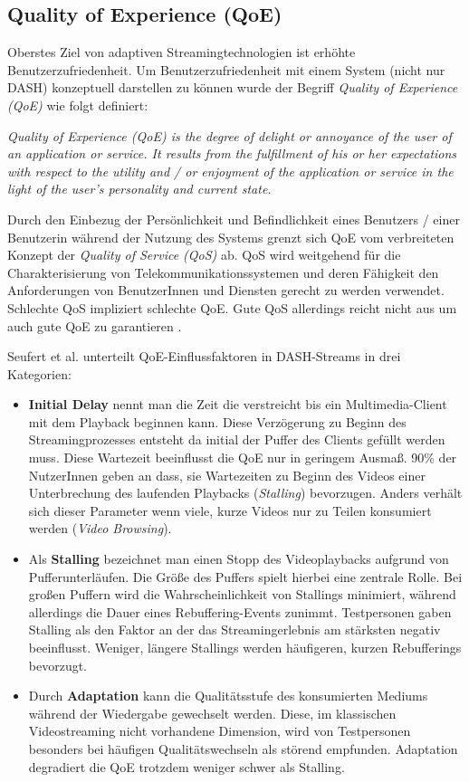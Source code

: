 \documentclass[paper = a4, fontsize = 12pt, parskip = half]{scrartcl} %
\begin{document}
\subsection{Quality of Experience (QoE)}
Oberstes Ziel von adaptiven Streamingtechnologien ist erhöhte Benutzerzufriedenheit. Um Benutzerzufriedenheit mit einem System (nicht nur DASH) konzeptuell darstellen zu können wurde der Begriff \textit{Quality of Experience (QoE)} wie folgt definiert:

\glqq \textit{Quality of Experience (QoE) is the degree of delight or annoyance of the user of an application or service. It results from the fulfillment of his or her expectations with respect to the utility and / or enjoyment of the application or service in the light of the user’s personality and current state.}\grqq \cite{brunnstrom_qualinet_2013}

Durch den Einbezug der Persönlichkeit und Befindlichkeit eines Benutzers / einer Benutzerin während der Nutzung des Systems grenzt sich QoE vom verbreiteten Konzept der \textit{Quality of Service (QoS)} ab. QoS wird weitgehend für die Charakterisierung von Telekommunikationssystemen und deren Fähigkeit den Anforderungen von BenutzerInnen und Diensten gerecht zu werden verwendet. Schlechte QoS impliziert schlechte QoE. Gute QoS allerdings reicht nicht aus um auch gute QoE zu garantieren \cite{brunnstrom_qualinet_2013}.

Seufert et al. \cite{seufert_survey_2015} unterteilt QoE-Einflussfaktoren in DASH-Streams in drei Kategorien:
\begin{itemize}
	\item \textbf{Initial Delay} nennt man die Zeit die verstreicht bis ein Multimedia-Client mit dem Playback beginnen kann. Diese Verzögerung zu Beginn des Streamingprozesses entsteht da initial der Puffer des Clients gefüllt werden muss. Diese Wartezeit beeinflusst die QoE nur in geringem Ausmaß. 90\% der NutzerInnen geben an dass, sie Wartezeiten zu Beginn des Videos einer Unterbrechung des laufenden Playbacks (\textit{Stalling}) bevorzugen. Anders verhält sich dieser Parameter wenn viele, kurze Videos nur zu Teilen konsumiert werden (\textit{Video Browsing}).
	\item Als \textbf{Stalling} bezeichnet man einen Stopp des Videoplaybacks aufgrund von Pufferunterläufen. Die Größe des Puffers spielt hierbei eine zentrale Rolle. Bei großen Puffern wird die Wahrscheinlichkeit von Stallings minimiert, während allerdings die Dauer eines Rebuffering-Events zunimmt. Testpersonen gaben Stalling als den Faktor an der das Streamingerlebnis am stärksten negativ beeinflusst. Weniger, längere Stallings werden häufigeren, kurzen Rebufferings bevorzugt.
	\item Durch \textbf{Adaptation} kann die Qualitätsstufe des konsumierten Mediums während der Wiedergabe gewechselt werden. Diese, im klassischen Videostreaming nicht vorhandene Dimension, wird von Testpersonen besonders bei häufigen Qualitätswechseln als störend empfunden. Adaptation degradiert die QoE trotzdem weniger schwer als Stalling.
\end{itemize}
\end{document}
